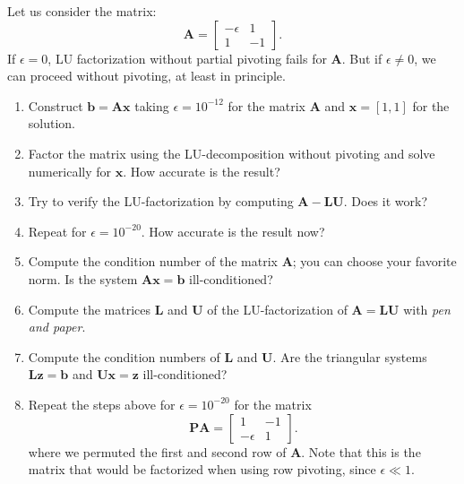 \begin{exercise}

	Let us consider the matrix:
	\[
		\mathbf{A} =
		\begin{bmatrix}
			-\epsilon & 1  \\
			1         & -1
		\end{bmatrix}.
	\]
	If $\epsilon=0$, LU factorization without partial pivoting fails for
	$\mathbf{A}$. But if $\epsilon\neq 0$, we can proceed without pivoting, at least
	in principle.

	\begin{enumerate}[label=(\alph*)]
		\item Construct $\mathbf{b}=\mathbf{Ax}$ taking $\epsilon=10^{-12}$ for
		      the matrix $\mathbf{A}$ and $\mathbf{x}=[1,1]$ for the solution.
		\item Factor the matrix using the LU-decomposition without pivoting and
		      solve numerically for $\mathbf{x}$. How accurate is the result?
		\item Try to verify the LU-factorization by computing
		      $\mathbf{A}-\mathbf{LU}$. Does it work?
		\item Repeat for $\epsilon=10^{-20}$. How accurate is the result now?
		\item Compute the condition number of the matrix $\mathbf{A}$; you can
		      choose your favorite norm. Is the system $\mathbf{Ax}=\mathbf{b}$
		      ill-conditioned?
		\item Compute the matrices $\mathbf{L}$ and $\mathbf{U}$ of the
		      LU-factorization of $\mathbf{A}=\mathbf{LU}$ with \emph{pen and paper}.
		\item Compute the condition numbers of $\mathbf{L}$ and $\mathbf{U}$.
		      Are the triangular systems $\mathbf{L}\mathbf{z}=\mathbf{b}$ and
		      $\mathbf{U}\mathbf{x}=\mathbf{z}$ ill-conditioned?
		\item Repeat the steps above for $\epsilon=10^{-20}$ for the matrix
		      \[
			      \mathbf{PA}=
			      \begin{bmatrix}
				      1         & -1 \\
				      -\epsilon & 1
			      \end{bmatrix}.
		      \]
		      where we permuted the first and second row of $\mathbf{A}$. Note that
		      this is the matrix that would be factorized when using row pivoting, since
		      $\epsilon\ll1$.
	\end{enumerate}

\end{exercise}

